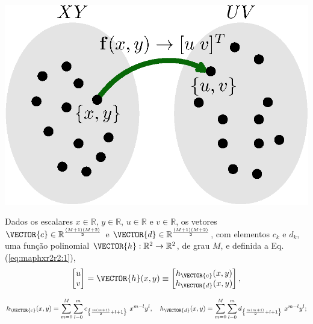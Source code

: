 \begin{theorem}
\label{theo:maphxr2r2}
~\\
\begin{minipage}{0.45\textwidth}
\centering
\includegraphics[width=0.8\linewidth]{chapters/mapeamento/mapeamento.eps} 
\end{minipage}
\begin{minipage}{0.55\textwidth}
Dados
os escalares 
$x \in \mathbb{R}$, 
$y \in \mathbb{R}$, 
$u \in \mathbb{R}$ e 
$v \in \mathbb{R}$,
os vetores $\VECTOR{c} \in \mathbb{R}^{\frac{(M+1)(M+2)}{2}}$ e
$\VECTOR{d} \in \mathbb{R}^{\frac{(M+1)(M+2)}{2}}$,
com elementos $c_k$ e $d_k$,
uma função polinomial $\VECTOR{h}:\mathbb{R}^2 \rightarrow \mathbb{R}^2$, de grau $M$, e 
definida a Eq. (\ref{eq:maphxr2r2:1}),
\begin{equation}\label{eq:maphxr2r2:1}
\begin{bmatrix}
u\\
v
\end{bmatrix} =
\VECTOR{h}(x,y) \equiv 
\begin{bmatrix}
h_{\VECTOR{c}}(x,y)\\
h_{\VECTOR{d}}(x,y)
\end{bmatrix},
\end{equation}
\end{minipage}
\noindent
\begin{equation}\label{eq:maphxr2r2:1a}
h_{\VECTOR{c}}(x,y) = \sum \limits_{m=0}^{M} \sum \limits_{l=0}^{m}c_{\left\{ \frac{m(m+1)}{2}+l+1\right\}}~x^{m-l}y^{l}, 
~~~
h_{\VECTOR{d}}(x,y) = \sum \limits_{m=0}^{M} \sum \limits_{l=0}^{m}d_{\left\{ \frac{m(m+1)}{2}+l+1\right\}}~x^{m-l}y^{l}; 
\end{equation}

\end{theorem}
